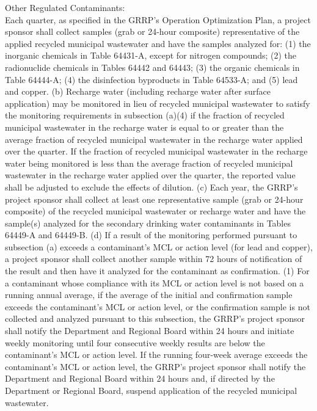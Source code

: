 \item Other Regulated Contaminants:\\
 Each quarter, as specified in the GRRP's Operation Optimization Plan, a project sponsor shall collect samples (grab or 24-hour composite) representative of the applied recycled municipal wastewater and have the samples analyzed for:
(1) the inorganic chemicals in Table 64431-A, except for nitrogen compounds;
(2) the radionuclide chemicals in Tables 64442 and 64443;
(3) the organic chemicals in Table 64444-A;
(4) the disinfection byproducts in Table 64533-A; and
(5) lead and copper.
(b) Recharge water (including recharge water after surface application) may be monitored in lieu of recycled municipal wastewater to satisfy the monitoring requirements in subsection (a)(4) if the fraction of recycled municipal wastewater in the recharge water is equal to or greater than the average fraction of recycled municipal wastewater in the recharge water applied over the quarter. If the fraction of recycled municipal wastewater in the recharge water being monitored is less than the average fraction of recycled municipal wastewater in the recharge water applied over the quarter, the reported value shall be adjusted to exclude the effects of dilution.
(c) Each year, the GRRP's project sponsor shall collect at least one representative sample (grab or 24-hour composite) of the recycled municipal wastewater or recharge water and have the sample(s) analyzed for the secondary drinking water contaminants in Tables 64449-A and 64449-B.
(d) If a result of the monitoring performed pursuant to subsection (a) exceeds a contaminant's MCL or action level (for lead and copper), a project sponsor shall collect another sample within 72 hours of notification of the result and then have it analyzed for the contaminant as confirmation.
(1) For a contaminant whose compliance with its MCL or action level is not based on a running annual average, if the average of the initial and confirmation sample exceeds the contaminant's MCL or action level, or the confirmation sample is not collected and analyzed pursuant to this subsection, the GRRP's project sponsor shall notify the Department and Regional Board within 24 hours and initiate weekly monitoring until four consecutive weekly results are below the contaminant's MCL or action level. If the running four-week average exceeds the contaminant's MCL or action level, the GRRP's project sponsor shall notify the Department and Regional Board within 24 hours and, if directed by the Department or Regional Board, suspend application of the recycled municipal wastewater.
